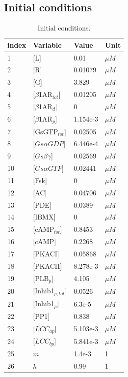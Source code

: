 \documentclass[fleqn,10pt]{physiome}
\begin{document}
\iffalse
    \subsection{Initial conditions}
    \begin{table}[ht]\centering
    \caption{Initial conditions.}\label{tab:ICs}
    \begin{tabular}{|l|l|l|l|}
    \hline
    index & Variable & Value & Unit \\ 
    \hline
    1  & [L] & 0.01 & $\mu M$ \\ 
    2  & [R] & 0.01079 & $\mu M$ \\ 
    3  & [G] & 3.829 & $\mu M$ \\ 
    4  & [$\beta$1AR$_{tot}$] & 0.01205 & $\mu M$ \\ 
    5  & [$\beta$1AR$_d$] & 0 & $\mu M$ \\ 
    6  & [$\beta$1AR$_p$] & 1.154e-3 & $\mu M$ \\ 
    7  & [GsGTP$_{tot}$] & 0.02505 & $\mu M$ \\ 
    8  & [$Gs\alpha GDP$] & 6.446e-4 & $\mu M$ \\ 
    9  & [$Gs\beta\gamma$] & 0.02569 & $\mu M$ \\ 
    10 & [$Gs\alpha GTP$] & 0.02441 & $\mu M$ \\ 
    11 & [Fsk] & 0 & $\mu M$ \\ 
    12 & [AC] & 0.04706 & $\mu M$ \\ 
    13 & [PDE] & 0.0389 & $\mu M$ \\ 
    14 & [IBMX] & 0 & $\mu M$ \\ 
    15 & [cAMP$_{tot}$] & 0.8453 & $\mu M$ \\ 
    16 & [cAMP] & 0.2268 & $\mu M$ \\ 
    17 & [PKACI] & 0.05868 & $\mu M$ \\ 
    18 & [PKACII] & 8.278e-3 & $\mu M$ \\ 
    19 & [PLB$_p$] & 4.105 & $\mu M$ \\ 
    20 & [Inhib1$_{p,tot}$] & 0.0526 & $\mu M$ \\ 
    21 & [Inhib1$_{p}$] & 6.3e-5 & $\mu M$ \\ 
    22 & [PP1] & 0.838 & $\mu M$ \\ 
    23 & [$LCC_{ap}$] & 5.103e-3 & $\mu M$ \\ 
    24 & [$LCC_{bp}$] & 5.841e-3 & $\mu M$ \\ 
    25 & $m$ & 1.4e-3 & 1 \\ 
    26 & $h$ & 0.99 & 1 \\ 

\end{tabular}
\end{table}
\end{document}
